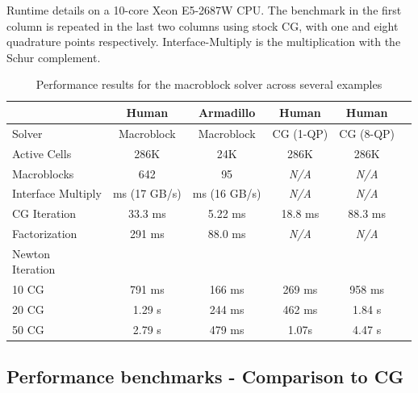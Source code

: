 \renewcommand{\arraystretch}{1.2}
\setlength{\tabcolsep}{3pt}
\begin{table}[b!]
\centering
\caption{Performance results for the macroblock solver
  across several examples}{Runtime details on a 10-core Xeon E5-2687W CPU. The benchmark in the first column is repeated in the last two columns using stock CG, with one and eight quadrature points respectively. \textsf{Interface-Multiply} is the multiplication with the Schur complement.}
\label{tbl:performance_results}
\begin{tabular}{ p{4cm} | ccccc}
    \hline
                        & Human   & Armadillo & Human   & Human   &  \\
    \hline
Solver                      & \parbox[t]{3cm}{\centering Macroblock} & \parbox[t]{3cm}{\centering Macroblock} & \parbox[t]{2.5cm}{\centering CG (1-QP)} & \parbox[t]{2.5cm}{\centering CG (8-QP)}& \\
Active Cells                & 286K & 24K    & 286K  & 286K  &  \\
Macroblocks                 & 642     & 95        & \textit{N/A}      & \textit{N/A}      &  \\
\parbox[t]{4cm}{Interface Multiply}          & \parbox[t]{3.5cm}{ ms (17 GB/s)} & \parbox[t]{3.5cm}{ ms (16 GB/s) }  & \textit{N/A} & \textit{N/A}      &  \\
CG Iteration                & 33.3 ms & 5.22 ms   & 18.8 ms & 88.3 ms &  \\
Factorization               & 291 ms  & 88.0 ms   & \textit{N/A} & \textit{N/A}      &  \\
\parbox[t]{2.5cm}{Newton \\ Iteration} &   &     &   &   &  \\
\parbox[t]{2.5cm}{\hspace{.3cm} 10 CG} & 791 ms  & 166 ms    & 269 ms  & 958 ms  &  \\
\parbox[t]{2.5cm}{\hspace{.3cm} 20 CG} & 1.29 s  & 244 ms    & 462 ms & 1.84 s  &  \\
\parbox[t]{2.5cm}{\hspace{.3cm} 50 CG\\ } & 2.79 s  & 479 ms    & 1.07s  & 4.47 s  &  \\
\hline
\end{tabular}
\end{table}

\subsection{Performance benchmarks - Comparison to CG}
\label{sec:macroblocks:cgcompare}

